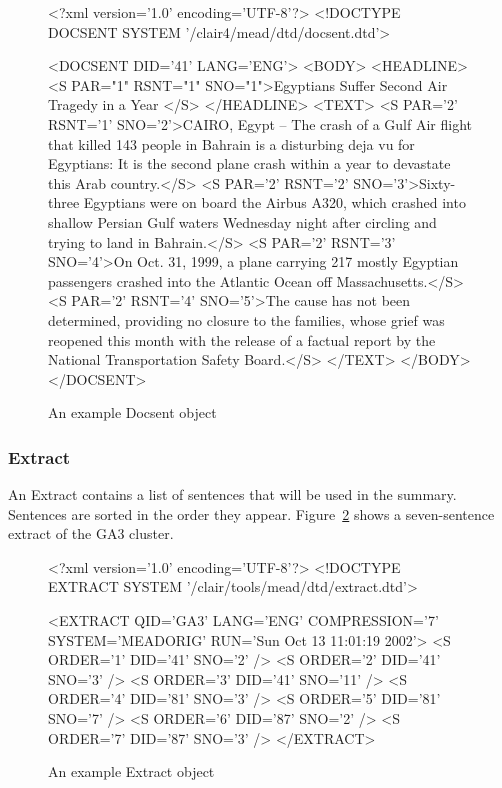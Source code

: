 \documentclass[10pt]{article}
\begin{document}
\begin{figure}[htp!]
\centering
\begin{boxedverbatim}
<?xml version='1.0' encoding='UTF-8'?>
<!DOCTYPE DOCSENT SYSTEM '/clair4/mead/dtd/docsent.dtd'>

<DOCSENT DID='41' LANG='ENG'>
<BODY>
<HEADLINE>
<S PAR="1" RSNT="1" SNO="1">Egyptians Suffer Second Air 
Tragedy in a Year </S>
</HEADLINE>
<TEXT>
<S PAR='2' RSNT='1' SNO='2'>CAIRO, Egypt   -- The crash of a
Gulf Air flight that killed 143 people in Bahrain is a disturbing 
deja vu for Egyptians: It is the second plane crash within a 
year to devastate this Arab country.</S>
<S PAR='2' RSNT='2' SNO='3'>Sixty-three Egyptians were on 
board the Airbus A320, which crashed into shallow Persian Gulf 
waters Wednesday night after circling and trying to land in 
Bahrain.</S>
<S PAR='2' RSNT='3' SNO='4'>On Oct. 31, 1999, a plane carrying 
217 mostly Egyptian passengers crashed into the Atlantic Ocean 
off Massachusetts.</S>
<S PAR='2' RSNT='4' SNO='5'>The cause has not been determined, 
providing no closure to the families, whose grief was reopened 
this month with the release of a factual report by the National 
Transportation Safety Board.</S>
</TEXT>
</BODY>
</DOCSENT>
\end{boxedverbatim}
\caption{An example Docsent object}
\label{figure:docsent-example}
\end{figure}



\subsubsection {Extract}

An Extract contains a list of sentences that will be used in the summary.
Sentences are sorted in the order they appear.
Figure~\ref{figure:extract-example} shows a seven-sentence
extract of the GA3 cluster.

\begin{figure}[htp!]
\centering
\begin{boxedverbatim}
<?xml version='1.0' encoding='UTF-8'?>
<!DOCTYPE EXTRACT SYSTEM '/clair/tools/mead/dtd/extract.dtd'>

<EXTRACT QID='GA3' LANG='ENG' COMPRESSION='7'
SYSTEM='MEADORIG' RUN='Sun Oct 13 11:01:19 2002'>
<S ORDER='1' DID='41' SNO='2' />
<S ORDER='2' DID='41' SNO='3' />
<S ORDER='3' DID='41' SNO='11' />
<S ORDER='4' DID='81' SNO='3' />
<S ORDER='5' DID='81' SNO='7' />
<S ORDER='6' DID='87' SNO='2' />
<S ORDER='7' DID='87' SNO='3' />
</EXTRACT>
\end{boxedverbatim}
\caption{An example Extract object}
\label{figure:extract-example}
\end{figure}
\end{document}
